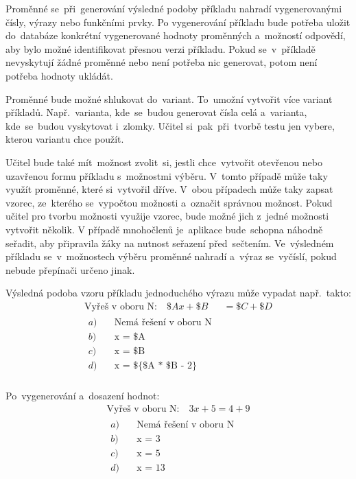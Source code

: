 \documentclass[10pt,a4paper]{article}
\begin{document}
            Proměnné se~při~generování výsledné podoby příkladu nahradí vygenerovanými čísly, výrazy nebo funkčními prvky. Po vygenerování příkladu bude potřeba uložit do~databáze konkrétní vygenerované hodnoty proměnných a~možností odpovědí, aby bylo možné identifikovat přesnou verzi příkladu. Pokud se~v~příkladě nevyskytují žádné proměnné nebo není potřeba nic generovat, potom není potřeba hodnoty ukládát.

            Proměnné bude možné shlukovat do~variant. To~umožní vytvořit více variant příkladů. Např.~varianta, kde~se~budou generovat čísla celá a~varianta, kde~se~budou vyskytovat i~zlomky. Učitel si~pak~při~tvorbě testu jen vybere, kterou variantu chce použít.

            Učitel bude také mít~možnost zvolit~si, jestli chce~vytvořit otevřenou nebo uzavřenou formu příkladu s~možnostmi výběru. V~tomto případě může taky využít proměnné, které si~vytvořil dříve. V~obou případech může taky zapsat vzorec, ze~kterého se~vypočtou možnosti a~označit správnou možnost. Pokud učitel pro tvorbu možnosti využije vzorec, bude možné jich z~jedné možnosti vytvořit několik. V případě mnohočlenů je~aplikace bude~schopna náhodně seřadit, aby připravila žáky na nutnost seřazení před~sečtením. Ve~výsledném příkladu se~v~možnostech výběru proměnné nahradí a~výraz se~vyčíslí, pokud nebude přepínači určeno jinak.

            Výsledná podoba vzoru příkladu jednoduchého výrazu může vypadat např.~takto:
            \begin{align*}
                \text{Vyřeš v oboru N:} \quad \$Ax + \$B &= \$C + \$D \\
                \begin{aligned}
                    a) \quad &\text{Nemá řešení v oboru N} \\
                    b) \quad &\text{x = \$A} \\
                    c) \quad &\text{x = \$B} \\
                    d) \quad &\text{x = \$\{\$A * \$B - 2\}} \\
                \end{aligned}
            \end{align*}

            Po~vygenerování a~dosazení hodnot:
            \begin{align*}
                \text{Vyřeš v oboru N:} \quad 3x + 5 = 4 + 9 \\
                \begin{aligned}
                    a) \quad &\text{Nemá řešení v oboru N} \\
                    b) \quad &\text{x = 3} \\
                    c) \quad &\text{x = 5} \\
                    d) \quad &\text{x = 13} \\
                \end{aligned}
            \end{align*}
\end{document}
